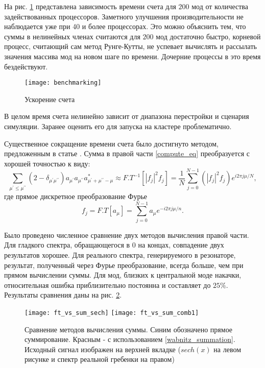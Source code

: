 На рис. \ref{bechmarking} представлена зависимость времени счета для $200$ мод от количества задействованных процессоров. Заметного улучшения производительности не наблюдается уже при 40 и более процессорах. Это можно объяснить тем, что суммы в нелинейных членах считаются для $200$ мод достаточно быстро, корневой процесс, считающий сам метод Рунге-Кутты, не успевает вычислять и рассылать значения массива мод на новом шаге по времени. Дочерние процессы в это время бездействуют.

\begin{figure}
 \centering
 \texttt{[image: benchmarking]}
 \caption{Ускорение счета} \label{bechmarking}
\end{figure}

В целом время счета нелинейно зависит от диапазона перестройки и сценария симуляции. Заранее оценить его для запуска на кластере проблематично.

Существенное сокращение времени счета было достигнуто методом, предложенным в статье \cite{Hansson2014oc}. Сумма в правой части \eqref{compute_eq} преобразуется с хорошей точностью к виду:
\begin{equation}\label{wabnitz_summation}
\sum_{\mu^\prime\le\mu^{\prime\prime}} (2-\delta_{\mu^\prime\mu^{\prime\prime}})a_{\mu^\prime}a_{\mu^{\prime\prime}}a_{\mu^\prime+\mu^{\prime\prime}-\mu}^*\approx F.T^{-1}[|f_j|^2f_j]
=\frac{1}{N}\sum_{j=0}^{N-1}(|f_j|^2f_j)e^{i2\pi j\mu /N},
\end{equation}
где прямое дискретное преобразование Фурье
\begin{equation}
f_j=F.T[a_\mu]=\sum_{j=0}^{N-1}a_\mu e^{-i2\pi j\mu/n}.
\end{equation}

Было проведено численное сравнение двух методов вычисления правой части. Для гладкого спектра, обращающегося в $0$ на концах, совпадение двух результатов хорошее. Для реального спектра, генерируемого в резонаторе, результат, полученный через Фурье преобразование, всегда больше, чем при прямом вычислении суммы. Для мод, близких к центральной моде накачки, относительная ошибка приблизительно постоянна и составляет до $25\%$. Результаты сравнения даны на рис. \ref{ft_vs_sum}.

\begin{figure}
 \texttt{[image: ft\_vs\_sum\_sech]}
 \texttt{[image: ft\_vs\_sum\_comb1]}
 \caption{Сравнение методов вычисления суммы. Синим обозначено прямое суммирование. Красным - с использованием \eqref{wabnitz_summation}. Исходный сигнал изображен на верхней вкладке ($sech(x)$ на левом рисунке и спектр реальной гребенки на правом)} \label{ft_vs_sum}
\end{figure}

